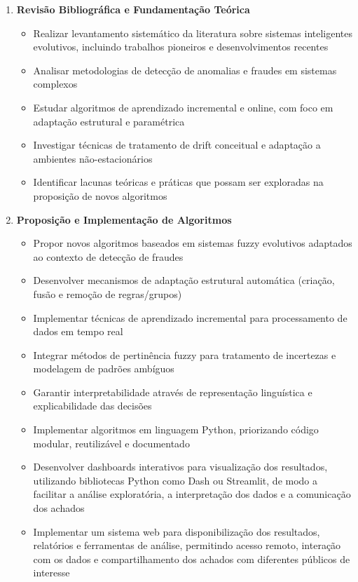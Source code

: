 \begin{enumerate}
\item \textbf{Revisão Bibliográfica e Fundamentação Teórica}
\begin{itemize}
\item Realizar levantamento sistemático da literatura sobre sistemas inteligentes evolutivos, incluindo trabalhos pioneiros e desenvolvimentos recentes
\item Analisar metodologias de detecção de anomalias e fraudes em sistemas complexos
\item Estudar algoritmos de aprendizado incremental e online, com foco em adaptação estrutural e paramétrica
\item Investigar técnicas de tratamento de drift conceitual e adaptação a ambientes não-estacionários
\item Identificar lacunas teóricas e práticas que possam ser exploradas na proposição de novos algoritmos
\end{itemize}

\item \textbf{Proposição e Implementação de Algoritmos}
\begin{itemize}
\item Propor novos algoritmos baseados em sistemas fuzzy evolutivos adaptados ao contexto de detecção de fraudes
\item Desenvolver mecanismos de adaptação estrutural automática (criação, fusão e remoção de regras/grupos)
\item Implementar técnicas de aprendizado incremental para processamento de dados em tempo real
\item Integrar métodos de pertinência fuzzy para tratamento de incertezas e modelagem de padrões ambíguos
\item Garantir interpretabilidade através de representação linguística e explicabilidade das decisões
\item Implementar algoritmos em linguagem Python, priorizando código modular, reutilizável e documentado
\item Desenvolver dashboards interativos para visualização dos resultados, utilizando bibliotecas Python como Dash ou Streamlit, de modo a facilitar a análise exploratória, a interpretação dos dados e a comunicação dos achados
\item Implementar um sistema web para disponibilização dos resultados, relatórios e ferramentas de análise, permitindo acesso remoto, interação com os dados e compartilhamento dos achados com diferentes públicos de interesse
\end{itemize}


\end{enumerate}
